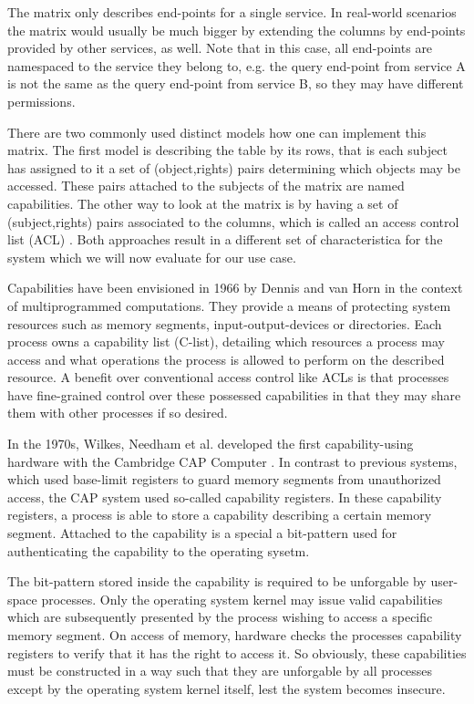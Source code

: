 The matrix only describes end-points for a single service.
In real-world scenarios the matrix would usually be much bigger by extending the columns by end-points provided by other services, as well.
Note that in this case, all end-points are namespaced to the service they belong to, e.g. the query end-point from service A is not the same as the query end-point from service B, so they may have different permissions.


There are two commonly used distinct models how one can implement this matrix.
The first model is describing the table by its rows, that is each subject has assigned to it a set of (object,rights) pairs determining which objects may be accessed.
These pairs attached to the subjects of the matrix are named capabilities.
The other way to look at the matrix is by having a set of (subject,rights) pairs associated to the columns, which is called an access control list (ACL) \cite{tanenbaum2014modern}.
Both approaches result in a different set of characteristica for the system which we will now evaluate for our use case.

\bigskip

\cite{dennis1966programming}

Capabilities have been envisioned in 1966 by Dennis and van Horn \cite{dennis1966programming} in the context of multiprogrammed computations.
They provide a means of protecting system resources such as memory segments, input-output-devices or directories.
Each process owns a capability list (C-list), detailing which resources a process may access and what operations the process is allowed to perform on the described resource.
A benefit over conventional access control like ACLs is that processes have fine-grained control over these possessed capabilities in that they may share them with other processes if so desired.

In the 1970s, Wilkes, Needham et al. developed the first capability-using hardware with the Cambridge CAP Computer \cite{wilkes1979cambridge}.
In contrast to previous systems, which used base-limit registers to guard memory segments from unauthorized access, the CAP system used so-called capability registers.
In these capability registers, a process is able to store a capability describing a certain memory segment.
Attached to the capability is a special a bit-pattern used for authenticating the capability to the operating sysetm.

The bit-pattern stored inside the capability is required to be unforgable by user-space processes.
Only the operating system kernel may issue valid capabilities which are subsequently presented by the process wishing to access a specific memory segment.
On access of memory, hardware checks the processes capability registers to verify that it has the right to access it.
So obviously, these capabilities must be constructed in a way such that they are unforgable by all processes except by the operating system kernel itself, lest the system becomes insecure.

